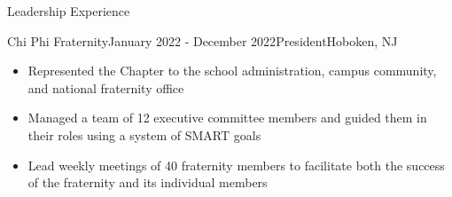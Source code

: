 \documentclass{resume} %
\begin{document}
\vspace{-1mm}
\begin{rSection}{Leadership Experience}
\begin{rSubsection}
{Chi Phi Fraternity}{January 2022 - December 2022}{President}{Hoboken, NJ}
\item[]\renewcommand\labelitemi{$\vcenter{\hbox{\tiny$\bullet$}}$} \begin{itemize}
    \item Represented the Chapter to the school administration, campus community, and national fraternity office
    \vspace{-1mm}
    \item Managed a team of 12 executive committee members and guided them in their roles using a system of SMART goals
    \vspace{-1mm}
    \item Lead weekly meetings of 40 fraternity members to facilitate both the success of the fraternity and its individual members
\end{itemize}
\end{rSubsection}
\vspace{-1mm}
\end{rSection}
\vspace{-1mm}
\end{document}
